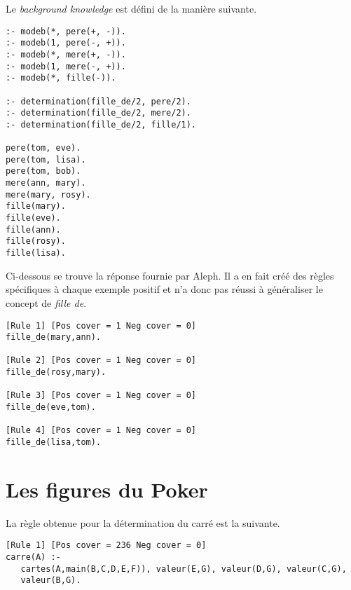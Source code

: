 \documentclass[a4paper,12pt]{article}
\begin{document}
Le \textit{background knowledge} est défini de la manière suivante.

\begin{lstlisting}[frame=single]
:- modeb(*, pere(+, -)).
:- modeb(1, pere(-, +)).
:- modeb(*, mere(+, -)).
:- modeb(1, mere(-, +)).
:- modeb(*, fille(-)).

:- determination(fille_de/2, pere/2).
:- determination(fille_de/2, mere/2).
:- determination(fille_de/2, fille/1).

pere(tom, eve).
pere(tom, lisa).
pere(tom, bob).
mere(ann, mary).
mere(mary, rosy).
fille(mary).
fille(eve).
fille(ann).
fille(rosy).
fille(lisa).
\end{lstlisting}

Ci-dessous se trouve la réponse fournie par Aleph. Il a en fait créé des règles spécifiques à chaque exemple positif et n'a donc pas réussi à généraliser le concept de \textit{fille de}.

\begin{lstlisting}[frame=single]
[Rule 1] [Pos cover = 1 Neg cover = 0]
fille_de(mary,ann).

[Rule 2] [Pos cover = 1 Neg cover = 0]
fille_de(rosy,mary).

[Rule 3] [Pos cover = 1 Neg cover = 0]
fille_de(eve,tom).

[Rule 4] [Pos cover = 1 Neg cover = 0]
fille_de(lisa,tom).
\end{lstlisting}

\section{Les figures du Poker}

La règle obtenue pour la détermination du carré est la suivante.

\begin{lstlisting}[frame=single]
[Rule 1] [Pos cover = 236 Neg cover = 0]
carre(A) :-
   cartes(A,main(B,C,D,E,F)), valeur(E,G), valeur(D,G), valeur(C,G), 
   valeur(B,G).
\end{lstlisting}
\end{document}
